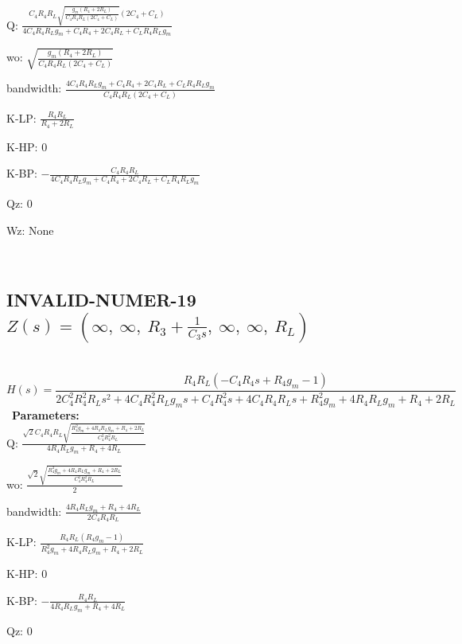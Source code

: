 \documentclass{article}
\begin{document}
Q: $\frac{C_{4} R_{4} R_{L} \sqrt{\frac{g_{m} \left(R_{4} + 2 R_{L}\right)}{C_{4} R_{4} R_{L} \left(2 C_{4} + C_{L}\right)}} \left(2 C_{4} + C_{L}\right)}{4 C_{4} R_{4} R_{L} g_{m} + C_{4} R_{4} + 2 C_{4} R_{L} + C_{L} R_{4} R_{L} g_{m}}$\ 

wo: $\sqrt{\frac{g_{m} \left(R_{4} + 2 R_{L}\right)}{C_{4} R_{4} R_{L} \left(2 C_{4} + C_{L}\right)}}$\ 

bandwidth: $\frac{4 C_{4} R_{4} R_{L} g_{m} + C_{4} R_{4} + 2 C_{4} R_{L} + C_{L} R_{4} R_{L} g_{m}}{C_{4} R_{4} R_{L} \left(2 C_{4} + C_{L}\right)}$\ 

K-LP: $\frac{R_{4} R_{L}}{R_{4} + 2 R_{L}}$\ 

K-HP: $0$\ 

K-BP: $- \frac{C_{4} R_{4} R_{L}}{4 C_{4} R_{4} R_{L} g_{m} + C_{4} R_{4} + 2 C_{4} R_{L} + C_{L} R_{4} R_{L} g_{m}}$\ 

Qz: $0$\ 

Wz: $\text{None}$\ 

\ 

\subsection{INVALID-NUMER-19 $Z(s) = \left( \infty, \  \infty, \  R_{3} + \frac{1}{C_{3} s}, \  \infty, \  \infty, \  R_{L}\right)$ } \ 
\textbf{\[H(s) = \frac{R_{4} R_{L} \left(- C_{4} R_{4} s + R_{4} g_{m} - 1\right)}{2 C_{4}^{2} R_{4}^{2} R_{L} s^{2} + 4 C_{4} R_{4}^{2} R_{L} g_{m} s + C_{4} R_{4}^{2} s + 4 C_{4} R_{4} R_{L} s + R_{4}^{2} g_{m} + 4 R_{4} R_{L} g_{m} + R_{4} + 2 R_{L}}\] } \ 
\textbf{Parameters:}\\ 

Q: $\frac{\sqrt{2} C_{4} R_{4} R_{L} \sqrt{\frac{R_{4}^{2} g_{m} + 4 R_{4} R_{L} g_{m} + R_{4} + 2 R_{L}}{C_{4}^{2} R_{4}^{2} R_{L}}}}{4 R_{4} R_{L} g_{m} + R_{4} + 4 R_{L}}$\ 

wo: $\frac{\sqrt{2} \sqrt{\frac{R_{4}^{2} g_{m} + 4 R_{4} R_{L} g_{m} + R_{4} + 2 R_{L}}{C_{4}^{2} R_{4}^{2} R_{L}}}}{2}$\ 

bandwidth: $\frac{4 R_{4} R_{L} g_{m} + R_{4} + 4 R_{L}}{2 C_{4} R_{4} R_{L}}$\ 

K-LP: $\frac{R_{4} R_{L} \left(R_{4} g_{m} - 1\right)}{R_{4}^{2} g_{m} + 4 R_{4} R_{L} g_{m} + R_{4} + 2 R_{L}}$\ 

K-HP: $0$\ 

K-BP: $- \frac{R_{4} R_{L}}{4 R_{4} R_{L} g_{m} + R_{4} + 4 R_{L}}$\ 

Qz: $0$\ 
\end{document}
